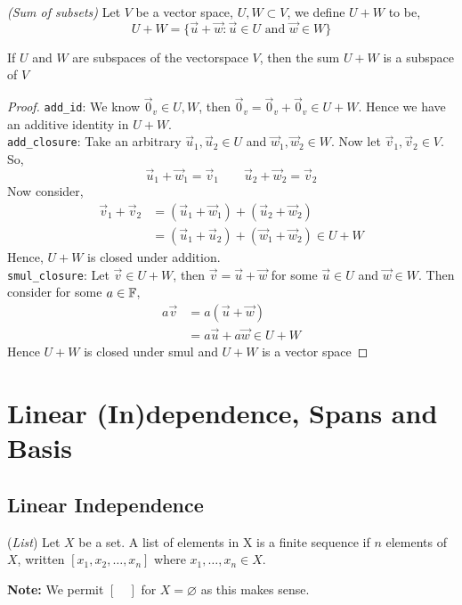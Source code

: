 \documentclass{article}
\begin{document}
\begin{ndefi}{\textit{(Sum of subsets)}}
  Let $V$ be a vector space, $U, W \subset V$, we define $U + W$ to be,
  $$ U + W = \{ \vec u + \vec w : \vec u \in U \text{ and } \vec w \in W \} $$
\end{ndefi}

\begin{nlemma}
  If $U$ and $W$ are subspaces of the vectorspace $V$, then the sum $U + W$ is a subspace of $V$
\end{nlemma}
\begin{proof}
  \texttt{add\_id}: We know $\vec 0_v \in U, W$, then $\vec 0_v = \vec 0_v + \vec 0_v \in U + W$. Hence we have an additive identity in $U + W$.\\
  \texttt{add\_closure}: Take an arbitrary $\vec u_1, \vec u_2 \in U$ and $\vec w_1, \vec w_2 \in W$. Now let $\vec v_1, \vec v_2 \in V$. So,
  $$ \vec u_1 + \vec w_1 = \vec v_1 \qquad \vec u_2 + \vec w_2 = \vec v_2 $$
  Now consider,
  \begin{align*}
    \vec v_1 + \vec v_2 &= (\vec u_1 + \vec w_1) + (\vec u_2 + \vec w_2)\\
    &= (\vec u_1 + \vec u_2) + (\vec w_1 + \vec w_2) \in U + W
  \end{align*}
  Hence, $U + W$ is closed under addition.\\
  \texttt{smul\_closure}: Let $\vec v \in U + W$, then $\vec v = \vec u + \vec w$ for some $\vec u \in U$ and $\vec w \in W$. Then consider for some $a\in\mathbb{F}$,
  \begin{align*}
    a\vec v &= a(\vec u + \vec w) \\
    &= a\vec u + a\vec w \in U + W
  \end{align*}
  Hence $U + W$ is closed under smul and $U + W$ is a vector space
\end{proof}

\section{Linear (In)dependence, Spans and Basis}

\subsection{Linear Independence}
\begin{ndefi}{(\textit{List})}
  Let $X$ be a set. A list of elements in X is a finite sequence if $n$ elements of $X$, written $[x_1, x_2, \dots, x_n]$ where $x_1, \dots, x_n \in X$.
\end{ndefi}
\textbf{Note:} We permit $[\quad]$ for $X = \varnothing$ as this makes sense.
\end{document}
